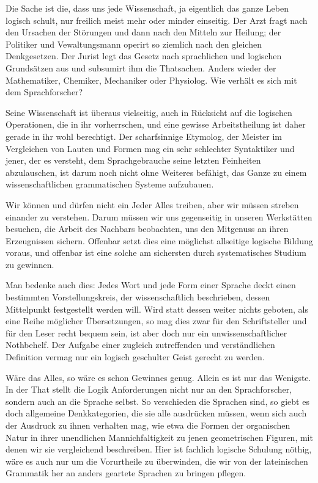 Die Sache ist die, dass uns jede Wissenschaft, ja eigentlich das ganze Leben logisch schult, nur freilich meist mehr oder minder einseitig. Der Arzt fragt nach den Ursachen der Störungen und dann nach den Mitteln zur Heilung; der Politiker und Vewaltungsmann operirt so \label{fp.48} ziemlich nach den gleichen Denkgesetzen. Der Jurist legt das Gesetz nach sprachlichen und logischen Grundsätzen aus und subsumirt ihm die Thatsachen. Anders wieder der Mathematiker, Chemiker, Mechaniker oder Physiolog. Wie verhält es sich mit dem Sprachforscher?

Seine Wissenschaft ist überaus vielseitig, auch in Rücksicht auf die logischen Operationen, die in ihr vorherrschen, und eine gewisse Arbeitstheilung ist daher gerade in ihr wohl berechtigt. Der scharfsinnige Etymolog, der Meister im Vergleichen von Lauten und Formen mag ein sehr schlechter Syntaktiker  und jener, der es versteht, dem Sprachgebrauche seine letzten Feinheiten abzulauschen, ist darum noch nicht ohne Weiteres befähigt, das Ganze zu einem wissenschaftlichen grammatischen Systeme aufzubauen.

Wir können und dürfen nicht ein Jeder Alles treiben, aber wir müssen streben einander zu verstehen. Darum müssen wir uns gegenseitig in unseren Werkstätten besuchen, die Arbeit des Nachbars beobachten, uns den Mitgenuss an ihren Erzeugnissen sichern. Offenbar setzt dies eine möglichst allseitige logische Bildung voraus, und offenbar ist eine solche am sichersten durch systematisches Studium zu gewinnen.

Man bedenke auch dies: Jedes Wort und jede Form einer Sprache deckt einen bestimmten Vorstellungskreis, der wissenschaftlich beschrieben, dessen Mittelpunkt festgestellt werden will. Wird statt dessen weiter nichts geboten, als eine Reihe möglicher Übersetzungen, so mag dies zwar für den Schriftsteller und für den Leser recht bequem sein, ist aber doch nur ein unwissenschaftlicher Nothbehelf. Der Aufgabe einer zugleich zutreffenden und verständlichen Definition vermag nur ein logisch geschulter Geist gerecht zu werden.

\label{sp.48}

Wäre das Alles, so wäre es schon Gewinnes genug. Allein es ist nur das Wenigste. In der That stellt die Logik Anforderungen nicht nur an den Sprachforscher, sondern auch an die Sprache selbst. So verschieden die Sprachen sind, so giebt es doch allgemeine Denkkategorien, die sie alle ausdrücken müssen, wenn sich auch der Ausdruck zu ihnen verhalten mag, wie etwa die Formen der organischen Natur in ihrer unendlichen Mannichfaltigkeit zu jenen geometrischen Figuren, mit denen wir sie vergleichend beschreiben. Hier ist fachlich logische Schulung nöthig, wäre es auch nur um die Vorurtheile zu überwinden, die wir von der lateinischen Grammatik her an anders geartete Sprachen zu bringen pflegen.

